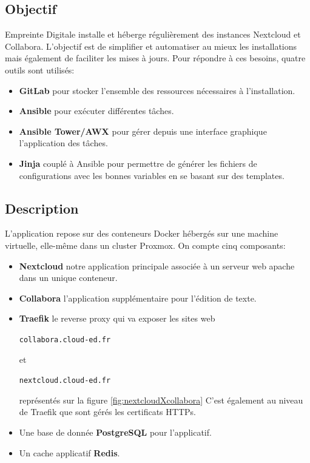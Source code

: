 \documentclass[12pt, a4paper, twoside]{article}
\begin{document}
\subsection{Objectif}
Empreinte Digitale installe et héberge régulièrement des instances \gls{Nextcloud} et \gls{Collabora}. 
L'objectif est de simplifier et automatiser au mieux les installations mais également de faciliter les mises à jours.
Pour répondre à ces besoins, quatre outils sont utilisés:
\begin{itemize}
    \item \textbf{\gls{GitLab}} pour stocker l'ensemble des ressources nécessaires à l'installation.
    \item \textbf{\gls{Ansible}} pour exécuter différentes tâches.
    \item \textbf{\gls{Ansible} Tower/AWX} pour gérer depuis une interface graphique l'application des tâches.
    \item \textbf{\gls{Jinja}} couplé à \gls{Ansible} pour permettre de générer les fichiers de configurations avec les bonnes variables en se basant sur des templates.
\end{itemize}

\subsection{Description}
L'application repose sur des conteneurs Docker hébergés sur une machine virtuelle, elle-même dans un \gls{cluster} \gls{Proxmox}. On compte cinq composants:
\begin{itemize}
    \item \textbf{\gls{Nextcloud}} notre application principale associée à un serveur web apache dans un unique conteneur.
    \item \textbf{\gls{Collabora}} l'application supplémentaire pour l'édition de texte.
    \item \textbf{\gls{Traefik}} le reverse proxy qui va exposer les sites web \begin{code}\texttt{collabora.cloud-ed.fr}\end{code} et \begin{code}\texttt{nextcloud.cloud-ed.fr}\end{code} représentés sur la figure \ref{fig:nextcloudXcollabora}
    C'est également au niveau de \gls{Traefik} que sont gérés les certificats HTTPs.
    \item Une base de donnée \textbf{PostgreSQL} pour l'applicatif.
    \item Un cache applicatif \textbf{Redis}.
\end{itemize}
\end{document}
